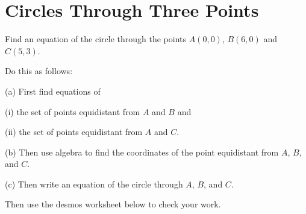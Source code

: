 \documentclass{ximera}
\begin{document}
\iffalse




\section*{Circles Through Three Points}

\begin{question}  \label{Q983g4332}
Find an equation of the circle through the points $A(0,0)$, $B(6,0)$ and $C(5,3)$.  

\begin{hint}
Do this as follows:

(a) First find equations of 

(i) the set of points equidistant from $A$ and $B$ and

(ii) the set of points equidistant from $A$ and $C$.

(b) Then use algebra to find the coordinates of the point equidistant from $A$, $B$, and $C$.

(c) Then write an equation of the circle through $A$, $B$, and $C$.

\end{hint}

Then use the desmos worksheet below to check your work.

\begin{onlineOnly}
    \begin{center}
\end{center}
\end{onlineOnly}

\end{question}
\end{document}
